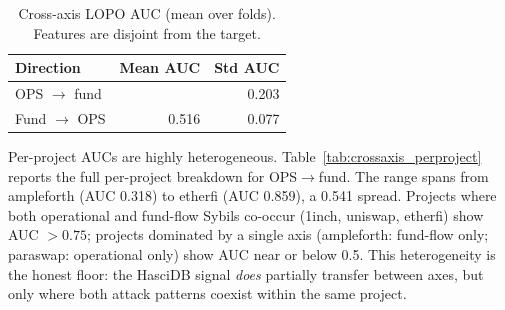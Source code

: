\documentclass[sigconf,nonacm=false]{acmart}
\begin{document}
\begin{table}[t]
\caption{Cross-axis LOPO AUC (mean over \largeScaleNProjects{} folds). Features are disjoint from the target.}
\label{tab:crossaxis}
\small
\begin{tabular}{lrr}
\toprule
Direction & Mean AUC & Std AUC \\
\midrule
OPS $\to$ fund & \largeScaleCrossAxisGbmMeanAuc{} & 0.203 \\
Fund $\to$ OPS & 0.516 & 0.077 \\
\bottomrule
\end{tabular}
\end{table}

Per-project AUCs are highly heterogeneous. Table~\ref{tab:crossaxis_perproject} reports the full per-project breakdown for OPS$\to$fund. The range spans from ampleforth (AUC 0.318) to etherfi (AUC 0.859), a 0.541 spread.
Projects where both operational and fund-flow Sybils co-occur (1inch, uniswap, etherfi) show AUC $> 0.75$; projects dominated by a single axis (ampleforth: fund-flow only; paraswap: operational only) show AUC near or below 0.5.
This heterogeneity is the honest floor: the HasciDB signal \textit{does} partially transfer between axes, but only where both attack patterns coexist within the same project.
\end{document}
